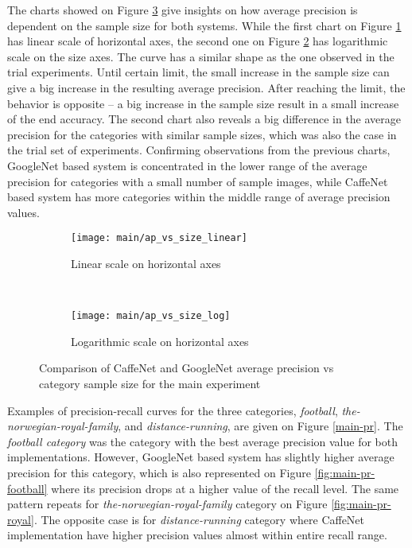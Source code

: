     The charts showed on Figure \ref{fig:main-ap-vs-size} give insights on how average precision is dependent on the sample size for both systems. While the first chart on Figure \ref{fig:main-ap-vs-size-linear} has linear scale of horizontal axes, the second one on Figure \ref{fig:main-ap-vs-size-log} has logarithmic scale on the size axes. The curve has a similar shape as the one observed in the trial experiments. Until certain limit, the small increase in the sample size can give a big increase in the resulting average precision. After reaching the limit, the behavior is opposite -- a big increase in the sample size result in a small increase of the end accuracy. The second chart also reveals a big difference in the average precision for the categories with similar sample sizes, which was also the case in the trial set of experiments. Confirming observations from the previous charts, GoogleNet based system is concentrated in the lower range of the average precision for categories with a small number of sample images, while CaffeNet based system has more categories within the middle range of average precision values.
    
    \begin{figure}[H]
        \centering
        \begin{subfigure}[a]{\textwidth}
            \texttt{[image: main/ap\_vs\_size\_linear]}
            \caption{Linear scale on horizontal axes}
            \label{fig:main-ap-vs-size-linear}
        \end{subfigure}
        \\
        \begin{subfigure}[a]{\textwidth}
            \texttt{[image: main/ap\_vs\_size\_log]}
            \caption{Logarithmic scale on horizontal axes}
            \label{fig:main-ap-vs-size-log}
        \end{subfigure}
        \caption[Main experiment. Average precision vs size for CaffeNet and GoogleNet]{Comparison of CaffeNet and GoogleNet average precision vs category sample size for the main experiment}
        \label{fig:main-ap-vs-size}
    \end{figure}
    
    Examples of precision-recall curves for the three categories, \textit{football}, \textit{the-norwegian-royal-family}, and \textit{distance-running}, are given on Figure \ref{main-pr}. The \textit{football category} was the category with the best average precision value for both implementations. However, GoogleNet based system has slightly higher average precision for this category, which is also represented on Figure \ref{fig:main-pr-football} where its precision drops at a higher value of the recall level. The same pattern repeats for \textit{the-norwegian-royal-family} category on Figure \ref{fig:main-pr-royal}. The opposite case is for \textit{distance-running} category where CaffeNet implementation have higher precision values almost within entire recall range.
    
